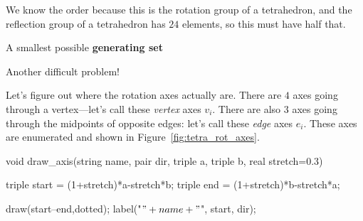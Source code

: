 \documentclass[../key.tex]{subfiles}
\begin{document}
\noindent We know the order because this is the rotation group of a tetrahedron, and the reflection group of a tetrahedron has $24$ elements, so this must have half that.

\begin{inner_problem}
\item A smallest possible \textbf{generating set}
\end{inner_problem}

\noindent Another difficult problem!

Let's figure out where the rotation axes actually are. There are $4$ axes going through a vertex---let's call these \textit{vertex} axes $v_i$. There are also $3$ axes going through the midpoints of opposite edges: let's call these \textit{edge} axes $e_i$. These axes are enumerated and shown in Figure~\ref{fig:tetra_rot_axes}.

\begin{asydef}
void draw_axis(string name, pair dir, triple a, triple b, real stretch=0.3) {
	triple start = (1+stretch)*a-stretch*b;
	triple end = (1+stretch)*b-stretch*a;

	draw(start--end,dotted);
	label("$" + name + "$", start, dir);
}
\end{asydef}
\end{document}
